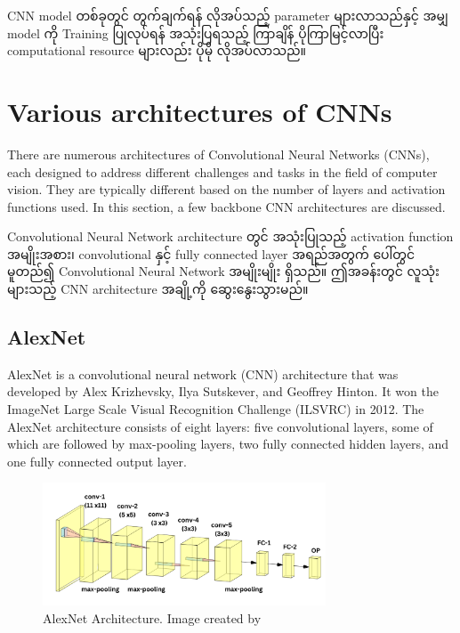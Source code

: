 CNN model တစ်ခုတွင် တွက်ချက်ရန် လိုအပ်သည့် parameter များလာသည်နှင့် အမျှ model ကို Training ပြုလုပ်ရန် အသုံးပြရသည့် ကြာချိန် ပိုကြာမြင့်လာပြီး computational resource များလည်း ပိုမို လိုအပ်လာသည်။ 

\newpage
\section{Various architectures of CNNs}\label{sec:vCNN}

There are numerous architectures of Convolutional Neural Networks (CNNs), each designed to address different challenges and tasks in the field of computer vision. They are typically different based on the number of layers and activation functions used. In this section, a few backbone CNN architectures are discussed. 

Convolutional Neural Network architecture တွင် အသုံးပြုသည့် activation function အမျိုးအစား၊ convolutional နှင့် fully connected layer အရည်အတွက် ပေါ်တွင် မူတည်၍ Convolutional Neural Network အမျိုးမျိုး ရှိသည်။ ဤအခန်းတွင် လူသုံးများသည့် CNN architecture အချို့ကို ဆွေးနွေးသွားမည်။ 

\subsection{AlexNet}

AlexNet \cite{AlexNet2012} is a convolutional neural network (CNN) architecture that was developed by Alex Krizhevsky, Ilya Sutskever, and Geoffrey Hinton. It won the ImageNet Large Scale Visual Recognition Challenge (ILSVRC) in 2012. The AlexNet architecture consists of eight layers: five convolutional layers, some of which are followed by max-pooling layers, two fully connected hidden layers, and one fully connected output layer.

\vspace{0.5em}
\begin{figure}[h]%
\centering 
\includegraphics[width=0.75\textwidth]{imgs/alexnet.png}
\caption{AlexNet Architecture. Image created by\cite{web:NNSVG}}\label{fig:alexnet}
\end{figure}


